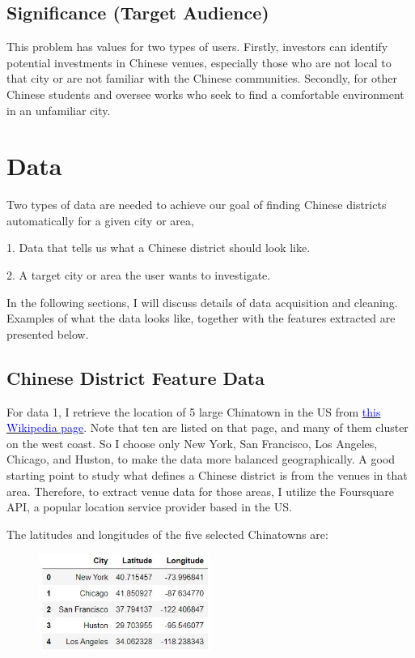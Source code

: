 \documentclass{article}
\begin{document}
\subsection{Significance (Target Audience)}
This problem has values for two types of users. Firstly, investors can identify potential investments in Chinese venues, especially those who are not local to that city or are not familiar with the Chinese communities. Secondly, for other Chinese students and oversee works who seek to find a comfortable environment in an unfamiliar city.

\section{Data}
Two types of data are needed to achieve our goal of finding Chinese districts automatically for a given city or area,

1. Data that tells us what a Chinese district should look like.

2. A target city or area the user wants to investigate.

In the following sections, I will discuss details of data acquisition and cleaning.
Examples of what the data looks like, together with the features extracted are presented below.

\subsection{Chinese District Feature Data}

For data 1, I retrieve the location of 5 large Chinatown in the US from \href{https://en.wikipedia.org/wiki/Chinatowns_in_the_United_States}{\textcolor{blue}{this Wikipedia page}}. 
Note that ten are listed on that page, and many of them cluster on the west coast. So I choose only New York, San Francisco, Los Angeles, Chicago, and Huston, to make the data more balanced geographically.
A good starting point to study what defines a Chinese district is from the venues in that area.
Therefore, to extract venue data for those areas, I utilize the Foursquare API, a popular location service provider based in the US.\cite{foursquare}

The latitudes and longitudes of the five selected Chinatowns are:
\begin{figure}[h]
\includegraphics[width=0.5\textwidth]{c1.jpg}
\centering
\end{figure}
\end{document}
